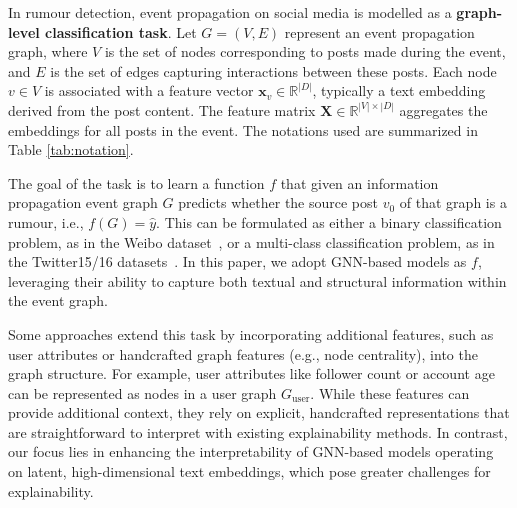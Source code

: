 



In rumour detection, event propagation on social media is modelled as a \textbf{graph-level classification task}. Let \( G = (V, E) \) represent an event propagation graph, where \( V \) is the set of nodes corresponding to posts made during the event, and \( E \) is the set of edges capturing interactions between these posts. Each node \( v \in V \) is associated with a feature vector \( \mathbf{x}_v \in \mathbb{R}^{|D|} \), typically a text embedding derived from the post content. The feature matrix \( \mathbf{X} \in \mathbb{R}^{|V| \times |D|} \) aggregates the embeddings for all posts in the event. The notations used are summarized in Table \ref{tab:notation}.

The goal of the task is to learn a function \( f \) that given an information propagation event graph \( G \) predicts whether the source post \( v_0 \) of that graph is a rumour, i.e., \( f(G) = \hat{y} \). 
This can be formulated as either a binary classification problem, as in the Weibo dataset~\cite{ma2016detecting}, or a multi-class classification problem, as in the Twitter15/16 datasets~\cite{ma2016detecting}. In this paper, we adopt GNN-based models as \( f \), leveraging their ability to capture both textual and structural information within the event graph.

Some approaches extend this task by incorporating additional features, such as user attributes or handcrafted graph features (e.g., node centrality), into the graph structure. For example, user attributes like follower count or account age can be represented as nodes in a user graph \( G_{\text{user}} \). While these features can provide additional context, they rely on explicit, handcrafted representations that are straightforward to interpret with existing explainability methods. In contrast, our focus lies in enhancing the interpretability of GNN-based models operating on latent, high-dimensional text embeddings, which pose greater challenges for explainability.

